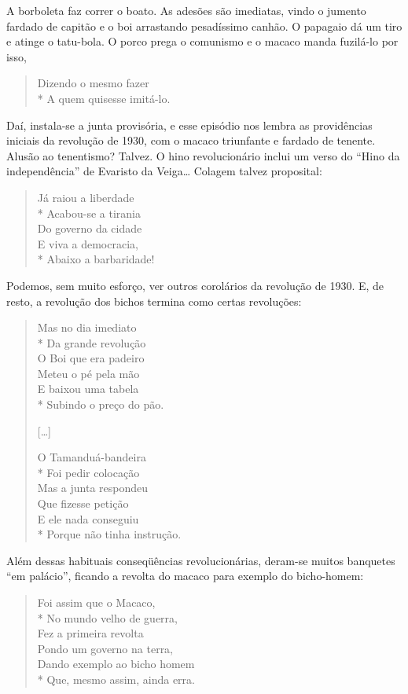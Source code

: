 A borboleta faz correr o boato. As adesões são imediatas, vindo o
jumento fardado de capitão e o boi arrastando pesadíssimo canhão. O
papagaio dá um tiro e atinge o tatu-bola. O porco prega o comunismo e
o macaco manda fuzilá-lo por isso,

\begin{verse}
Dizendo o mesmo fazer\\*
A quem quisesse imitá-lo.
\end{verse}

Daí, instala-se a junta provisória, e esse episódio nos lembra as
providências iniciais da revolução de 1930, com o macaco triunfante e
fardado de tenente. Alusão ao tenentismo? Talvez. O hino
revolucionário inclui um verso do “Hino da independência” de Evaristo
da Veiga\ldots{} Colagem talvez proposital:

\begin{verse}
Já raiou a liberdade\\*
Acabou-se a tirania\\
Do governo da cidade\\
E viva a democracia,\\*
Abaixo a barbaridade!
\end{verse}

Podemos, sem muito esforço, ver outros corolários da revolução de
1930. E, de resto, a revolução dos bichos termina como certas
revoluções:

\begin{verse}
Mas no dia imediato\\*
Da grande revolução \\
O Boi que era padeiro\\
Meteu o pé pela mão\\
E baixou uma tabela\\*
Subindo o preço do pão.

[\ldots{}]

O Tamanduá-bandeira\\*
Foi pedir colocação\\
Mas a junta respondeu\\
Que fizesse petição\\
E ele nada conseguiu\\*
Porque não tinha instrução.
\end{verse}

Além dessas habituais conseqüências revolucionárias, deram-se muitos
banquetes “em palácio”, ficando a revolta do macaco para exemplo do
bicho-homem:

\begin{verse}
Foi assim que o Macaco,\\*
No mundo velho de guerra,\\
Fez a primeira revolta\\
Pondo um governo na terra,\\
Dando exemplo ao bicho homem\\*
Que, mesmo assim, ainda erra.
\end{verse}

